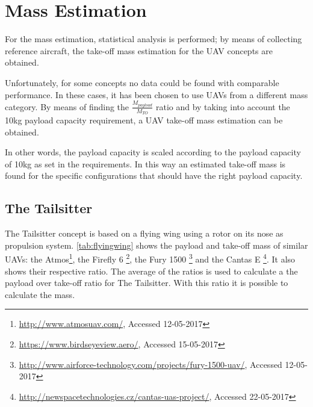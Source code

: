 \label{sec:perf_appr}


\section{Mass Estimation}
\label{sec:mass_esti}

For the mass estimation, statistical analysis is performed; by means of collecting reference aircraft, the take-off mass estimation for the UAV concepts are obtained. 

Unfortunately, for some concepts no data could be found with comparable performance. In these cases, it has been chosen to use UAVs from a different mass category. By means of finding the $\frac{M_{payload}}{M_{TO}}$ ratio and by taking into account the 10kg payload capacity requirement, a UAV take-off mass estimation can be obtained.

In other words, the payload capacity is scaled according to the payload capacity of 10kg as set in the requirements. In this way an estimated take-off mass is found for the specific configurations that should have the right payload capacity.

\subsection{The Tailsitter}
The Tailsitter concept is based on a flying wing using a rotor on its nose as propulsion system. \autoref{tab:flyingwing} shows the payload and take-off mass of similar UAVs: the Atmos\footnote{\url{http://www.atmosuav.com/}, Accessed 12-05-2017}, the Firefly 6 \footnote{\url{https://www.birdseyeview.aero/}, Accessed 15-05-2017}, the Fury 1500 \footnote{\url{http://www.airforce-technology.com/projects/fury-1500-uav/}, Accessed 12-05-2017} and the Cantas E \footnote{\url{http://newspacetechnologies.cz/cantas-uas-project/}, Accessed 22-05-2017}. It also shows their respective ratio. The average of the ratios is used to calculate a the payload over take-off ratio for The Tailsitter. With this ratio it is possible to calculate the mass.

